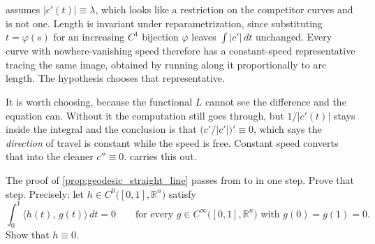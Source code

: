 \begin{remark}
\label{rem:geodesic_constant_speed}
 assumes $\lvert c'(t)\rvert \equiv \lambda$, which looks like
a restriction on the competitor curves and is not one. Length is invariant under
reparametrization, since substituting $t = \varphi(s)$ for an increasing $C^1$ bijection
$\varphi$ leaves $\int\lvert c'\rvert\,dt$ unchanged. Every curve with nowhere-vanishing speed
therefore has a constant-speed representative tracing the same image, obtained by running along
it proportionally to arc length. The hypothesis chooses that representative.

It is worth choosing, because the functional $L$ cannot see the difference and the equation can.
Without it the computation still goes through, but $1/\lvert c'(t)\rvert$ stays inside the
integral and the conclusion is that $\big(c'/\lvert c'\rvert\big)' \equiv 0$, which says the
\emph{direction} of travel is constant while the speed is free. Constant speed converts that
into the cleaner $c'' \equiv 0$.  carries this out.
\end{remark}

\begin{aiexercise}
\label{ex:ai_fundamental_lemma}
The proof of \cref{prop:geodesic_straight_line} passes from  to  in one step. Prove that step. Precisely: let
$h \in C^0\big([0,1],\mathbb{R}^n\big)$ satisfy
\[\int_0^1 \big\langle h(t),\,g(t)\big\rangle\,dt = 0
  \qquad\text{for every } g \in C^\infty\big([0,1],\mathbb{R}^n\big) \text{ with } g(0)=g(1)=0.\]
Show that $h \equiv 0$.

\end{aiexercise}

